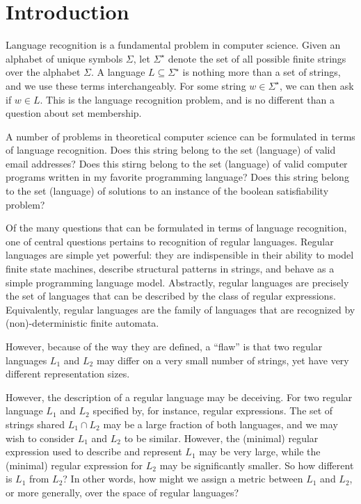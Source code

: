 
\section{Introduction}

Language recognition is a fundamental problem in computer science.
Given an alphabet of unique symbols \(\Sigma\),
let \(\Sigma^\star\) denote the set of all possible finite strings over
the alphabet \(\Sigma\).
A language \(L \subseteq \Sigma^\star\) is nothing more than a set of strings,
and we use these terms interchangeably.
For some string \(w \in \Sigma^\star\),
we can then ask if \(w \in L\).
This is the language recognition problem,
and is no different than a question about set membership.

A number of problems in theoretical computer science can be formulated
in terms of language recognition.
Does this string belong to the set (language) of valid email addresses?
Does this stirng belong to the set (language) of valid
computer programs written in my favorite programming language?
Does this string belong to the set (language) of solutions
to an instance of the boolean satisfiability problem?

Of the many questions that can be formulated in terms of language recognition,
one of central questions pertains to recognition of regular languages.
Regular languages are simple yet powerful:
they are indispensible in their ability to model
finite state machines,
describe structural patterns in strings,
and behave as a simple programming language model.
Abstractly, regular languages are precisely the set of languages that
can be described by the class of regular expressions.
Equivalently, regular languages are the family of languages
that are recognized by (non)-deterministic finite automata.

However, because of the way they are defined, a ``flaw'' is that
two regular languages \(L_1\) and \(L_2\) may differ on a very small number
of strings, yet have very different representation sizes.


However, the description of a regular language may be deceiving.
For two regular language \(L_1\) and \(L_2\) specified by,
for instance, regular expressions.
The set of strings shared \(L_1 \cap L_2\) may be a large fraction of both
languages, and we may wish to consider \(L_1\) and \(L_2\) to be similar.
However, the (minimal) regular expression used to describe and represent
\(L_1\) may be very large, while the (minimal) regular
expression for \(L_2\) may be significantly smaller.
So how different is \(L_1\) from \(L_2\)?
In other words, how might we assign a metric between \(L_1\) and \(L_2\),
or more generally, over the space of regular languages?

